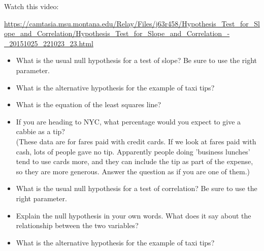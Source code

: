 \def\theTopic{Reading 16}

Watch this video:

\url{https://camtasia.msu.montana.edu/Relay/Files/j63r458/Hypothesis_Test_for_Slope_and_Correlation/Hypothesis_Test_for_Slope_and_Correlation_-_20151025_221023_23.html}
\large

\begin{itemize}
 \item What is the usual null hypothesis for a test of slope? Be sure
   to use the right parameter. \vspace{2cm}

 \item What is the alternative hypothesis for the example of taxi tips?\vspace{2cm}

 \item What is the equation of the least squares line?\vspace{2cm}

 \item If you are heading to NYC, what percentage would you expect to give a
   cabbie as a tip?\\
    (These data are for fares paid with credit cards. If we look at
    fares paid with cash, lots of people gave no tip. Apparently
    people doing 'business lunches' tend to use cards more, and they
    can include the tip as part of the expense, so they are more
    generous.  Answer the question as if you are one of them.) \vspace{2cm}


  \item What is the usual null hypothesis for a test of correlation? Be sure
   to use the right parameter. \vspace{2cm}
  \item Explain the null hypothesis in your own words.  What does it
    say about the relationship between the two variables?\vspace{2cm}

  \item What is the alternative hypothesis for the example of taxi tips?\vspace{2cm}

\end{itemize}
\normalsize

